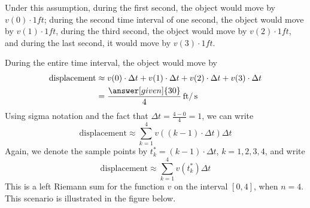\documentclass{ximera}
\begin{document}
\begin{example}
\begin{explanation}
Under this assumption, during the first second, the object would move
by $v(0)\cdot1 \unit{ft}$; during the second time interval of one
second, the object would move by $v(1)\cdot1 \unit{ft}$, during the
third second, the object would move by $v(2)\cdot1 \unit{ft}$, and
during the last second, it would move by $v(3)\cdot1 \unit{ft}$.

During the entire time interval, the object would move by
\begin{align*}
  \text{displacement} &\approx v(0)\cdot\Delta t+v(1)\cdot\Delta t+v(2)\cdot\Delta t+v(3)\cdot\Delta t\\
  &=\frac{\answer[given]{30}}{4} \unit{ft}/\unit{s}
\end{align*}
Using sigma notation and the fact that $\Delta t=\frac{4-0}{4}=1$, we can write
\[
   \text{displacement}\approx \sum_{k=1}^4v((k-1)\cdot\Delta t)\Delta t
  \]
  Again, we denote the  sample points by $t_{k}^*=(k-1)\cdot\Delta t$, $k=1,2,3,4$, and write
  \[
   \text{displacement}\approx \sum_{k=1}^4v(t_{k}^*)\Delta t
  \]
  This is a left Riemann sum for the function $v$ on the interval $[0,4]$, when $n=4$.
This scenario is illustrated in the figure below.
\begin{image}
\end{image}
\end{explanation}
\end{example}
\end{document}
